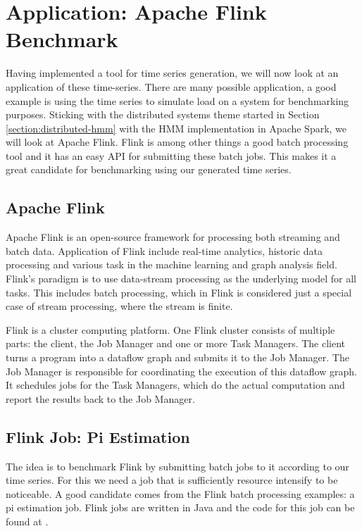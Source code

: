 \chapter{Application: Apache Flink Benchmark}\label{chapter:benchmark}

Having implemented a tool for time series generation, we will now look at an application of these time-series. There are many possible application, a good example is using the time series to simulate load on a system for benchmarking purposes. Sticking with the distributed systems theme started in Section \ref{section:distributed-hmm} with the HMM implementation in Apache Spark, we will look at Apache Flink. Flink is among other things a good batch processing tool and it has an easy API for submitting these batch jobs. This makes it a great candidate for benchmarking using our generated time series. 

\section{Apache Flink}

Apache Flink is an open-source framework for processing both streaming and batch data. Application of Flink include real-time analytics, historic data processing and various task in the machine learning and graph analysis field. Flink's paradigm is to use data-stream processing as the underlying model for all tasks. This includes batch processing, which in Flink is considered just a special case of stream processing, where the stream is finite. 

Flink is a cluster computing platform. One Flink cluster consists of multiple parts: the client, the Job Manager and one or more Task Managers. The client turns a program into a dataflow graph and submits it to the Job Manager. The Job Manager is responsible for coordinating the execution of this dataflow graph. It schedules jobs for the Task Managers, which do the actual computation and report the results back to the Job Manager. \parencite{carbone2015apache}

\section{Flink Job: Pi Estimation}

The idea is to benchmark Flink by submitting batch jobs to it according to our time series. For this we need a job that is sufficiently resource intensify to be noticeable. A good candidate comes from the Flink batch processing examples: a pi estimation job. Flink jobs are written in Java and the code for this job can be found at \parencite{flinkpiestim}. 

